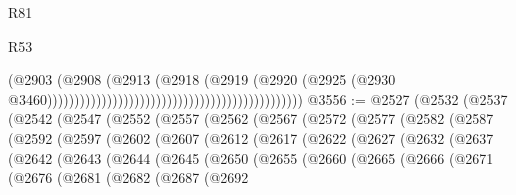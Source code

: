 \begin{lexlean}{R81}
\begin{lexlean}{R53}
\begin{coremodule}
{{{{{{{{{{{{{{{{{{{{{{{{{{{{{{{{{{{{{{{{{{{{{{{{{{{{{{{{{{{{{{{{{{{{{{{{{{{{{{{{{{{{{{{{{{{{{{{{{{{{{{{{{{{{{{{{                                                                                  (@2903
                                                                                    (@2908
                                                                                      (@2913
                                                                                        (@2918
                                                                                          (@2919
                                                                                            (@2920
                                                                                              (@2925
                                                                                                (@2930
                                                                                                  @3460)))))))))))))))))))))))))))))))))))))))))))))))
@3556 := @2527
    (@2532
      (@2537
        (@2542
          (@2547
            (@2552
              (@2557
                (@2562
                  (@2567
                    (@2572
                      (@2577
                        (@2582
                          (@2587
                            (@2592
                              (@2597
                                (@2602
                                  (@2607
                                    (@2612
                                      (@2617
                                        (@2622
                                          (@2627
                                            (@2632
                                              (@2637
                                                (@2642
                                                  (@2643
                                                    (@2644
                                                      (@2645
                                                        (@2650
                                                          (@2655
                                                            (@2660
                                                              (@2665
                                                                (@2666
                                                                  (@2671
                                                                    (@2676
                                                                      (@2681
                                                                        (@2682
                                                                          (@2687
                                                                            (@2692
}}}}}}}}}}}}}}}}}}}}}}}}}}}}}}}}}}}}}}}}}}}}}}}}}}}}}}}}}}}}}}}}}}}}}}}}}}}}}}}}}}}}}}}}}}}}}}}}}}}}}}}}}}}}}}}}
\end{coremodule}
\end{lexlean}
\end{lexlean}
